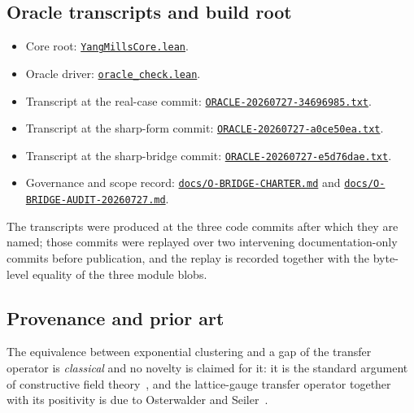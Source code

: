 \documentclass[11pt]{article}
\theoremstyle{definition}
\newcommand{\anchor}{ad9c93d793fa0b082f2373c2aea3ea5b99f9c6b8}
\newcommand{\repofile}[2]{%
  \href{https://github.com/lluiseriksson/THE-ERIKSSON-PROGRAMME/blob/\anchor/#1}{\nolinkurl{#2}}}
\begin{document}
\subsection*{Oracle transcripts and build root}

\begin{itemize}
\item Core root:
  \repofile{YangMillsCore.lean}{YangMillsCore.lean}.
\item Oracle driver:
  \repofile{oracle\_check.lean}{oracle\_check.lean}.
\item Transcript at the real-case commit:
  \repofile{docs/oracle-transcripts/ORACLE-20260727-34696985.txt}{ORACLE-20260727-34696985.txt}.
\item Transcript at the sharp-form commit:
  \repofile{docs/oracle-transcripts/ORACLE-20260727-a0ce50ea.txt}{ORACLE-20260727-a0ce50ea.txt}.
\item Transcript at the sharp-bridge commit:
  \repofile{docs/oracle-transcripts/ORACLE-20260727-e5d76dae.txt}{ORACLE-20260727-e5d76dae.txt}.
\item Governance and scope record:
  \repofile{docs/O-BRIDGE-CHARTER.md}{docs/O-BRIDGE-CHARTER.md} and
  \repofile{docs/O-BRIDGE-AUDIT-20260727.md}{docs/O-BRIDGE-AUDIT-20260727.md}.
\end{itemize}

The transcripts were produced at the three code commits after which they
are named; those commits were replayed over two intervening
documentation-only commits before publication, and the replay is recorded
together with the byte-level equality of the three module blobs.

\subsection*{Provenance and prior art}

The equivalence between exponential clustering and a gap of the transfer
operator is \emph{classical} and no novelty is claimed for it: it is the
standard argument of constructive field
theory~\cite{GlimmJaffe,Simon}, and the lattice-gauge transfer operator
together with its positivity is due to Osterwalder and
Seiler~\cite{OsterwalderSeiler}.
\end{document}
